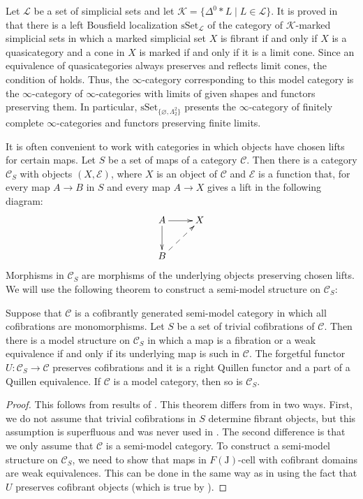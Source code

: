 \documentclass[reqno]{amsart}
\theoremstyle{definition}
\theoremstyle{remark}
\newcommand{\fs}[1]{\mathrm{#1}}
\newcommand{\cat}[1]{\mathcal{#1}}
\newcommand{\C}{\cat{C}}
\newcommand{\sSet}{\fs{sSet}}
\newcommand{\I}{\fs{I}}
\newcommand{\J}{\fs{J}}
\newcommand{\class}[2]{#1\text{-}\mathrm{#2}}
\newcommand{\Icell}[1][\I]{\class{#1}{cell}}
\numberwithin{figure}{section}
\begin{document}
\begin{example}
Let $\mathcal{L}$ be a set of simplicial sets and let $\mathcal{K} = \{ \Delta^0 * L \mid L \in \mathcal{L} \}$.
It is proved in \cite[Proposition~4.1]{marked-obj} that there is a left Bousfield localization $\sSet_\mathcal{L}$ of the category of $\mathcal{K}$-marked simplicial sets
in which a marked simplicial set $X$ is fibrant if and only if $X$ is a quasicategory and a cone in $X$ is marked if and only if it is a limit cone.
Since an equivalence of quasicategories always preserves and reflects limit cones, the condition of  holds.
Thus, the $\infty$-category corresponding to this model category is the $\infty$-category of $\infty$-categories with limits of given shapes and functors preserving them.
In particular, $\sSet_{\{ \varnothing, \Lambda^2_2 \}}$ presents the $\infty$-category of finitely complete $\infty$-categories and functors preserving finite limits.
\end{example}


It is often convenient to work with categories in which objects have chosen lifts for certain maps.
Let $S$ be a set of maps of a category $\C$.
Then there is a category $\C_S$ with objects $(X,\mathcal{E})$, where $X$ is an object of $\C$ and $\mathcal{E}$ is a function that, for every map $A \to B$ in $S$ and every map $A \to X$ gives a lift in the following diagram:
\[ \xymatrix{ A \ar[r] \ar[d] & X \\
              B \ar@{-->}[ur]
            } \]
Morphisms in $\C_S$ are morphisms of the underlying objects preserving chosen lifts.
We will use the following theorem to construct a semi-model structure on $\C_S$:

\begin{thm}
Suppose that $\C$ is a cofibrantly generated semi-model category in which all cofibrations are monomorphisms.
Let $S$ be a set of trivial cofibrations of $\C$.
Then there is a model structure on $\C_S$ in which a map is a fibration or a weak equivalence if and only if its underlying map is such in $\C$.
The forgetful functor $U : \C_S \to \C$ preserves cofibrations and it is a right Quillen functor and a part of a Quillen equivalence.
If $\C$ is a model category, then so is $\C_S$.
\end{thm}
\begin{proof}
This follows from results of \cite{algebraic-fibrant-objects}.
This theorem differs from \cite[Theorem~2.20]{algebraic-fibrant-objects} in two ways.
First, we do not assume that trivial cofibrations in $S$ determine fibrant objects, but this assumption is superfluous and was never used in \cite{algebraic-fibrant-objects}.
The second difference is that we only assume that $\C$ is a semi-model category.
To construct a semi-model structure on $\C_S$, we need to show that maps in $\Icell[F(\J)]$ with cofibrant domains are weak equivalences.
This can be done in the same way as in \cite[Theorem~2.20]{algebraic-fibrant-objects} using the fact that $U$ preserves cofibrant objects (which is true by \cite[Corollary~2.18]{algebraic-fibrant-objects}).
\end{proof}
\end{document}
